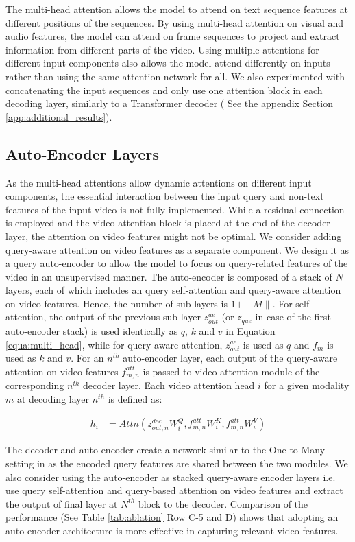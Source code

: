 \documentclass[11pt,a4paper]{article}
\begin{document}
The multi-head attention allows the model to attend on text sequence features at different positions of the sequences. 
By using multi-head attention on visual and audio features, the model can attend on frame sequences to project and extract information from different parts of the video. Using multiple attentions for different input components also allows the model attend differently on inputs rather than using the same attention network for all. We also experimented with concatenating the input sequences and only use one attention block in each decoding layer, similarly to a Transformer decoder ( See the appendix Section \ref{app:additional_results}). 

\subsection{Auto-Encoder Layers}
As the multi-head attentions allow dynamic attentions on different input components, the essential interaction between the input query and non-text features of the input video is not fully implemented. While a residual connection is employed and the video attention block is placed at the end of the decoder layer, the attention on video features might not be optimal. We consider adding query-aware attention on video features as a separate component. We design it as a query auto-encoder to allow the model to focus on query-related features of the video in an unsupervised manner. The auto-encoder is composed of a stack of $N$ layers, each of which includes an query self-attention and query-aware attention on video features. Hence, the number of sub-layers is $1 + \|M\|$. For self-attention, the output of the previous sub-layer $z^{ae}_{out}$ (or $z_{que}$ in case of the first auto-encoder stack) is used identically as $q$, $k$ and $v$ in Equation \ref{equa:multi_head}, while for query-aware attention, $z^{ae}_{out}$ is used as $q$ and $f_m$ is used as $k$ and $v$. For an $n^{th}$ auto-encoder layer, each output of the query-aware attention on video features $f_{m,n}^{att}$ is passed to video attention module of the corresponding $n^{th}$ decoder layer. Each video attention head $i$ for a given modality $m$ at decoding layer $n^{th}$ is defined as: 

\begin{align*}
    h_i &= Attn(z^{dec}_{out,n} W^Q_i, f_{m,n}^{att} W^K_i, f_{m,n}^{att} W^V_i) 
\end{align*}

The decoder and auto-encoder create a network similar to the One-to-Many setting in \cite{luong2015multi} as the encoded query features are shared between the two modules. We also consider using the auto-encoder as stacked query-aware encoder layers i.e. use query self-attention and query-based attention on video features and extract the output of final layer at $N^{th}$ block to the decoder. Comparison of the performance (See Table \ref{tab:ablation} Row C-5 and D) shows that adopting an auto-encoder architecture is more effective in capturing relevant video features.
\end{document}

